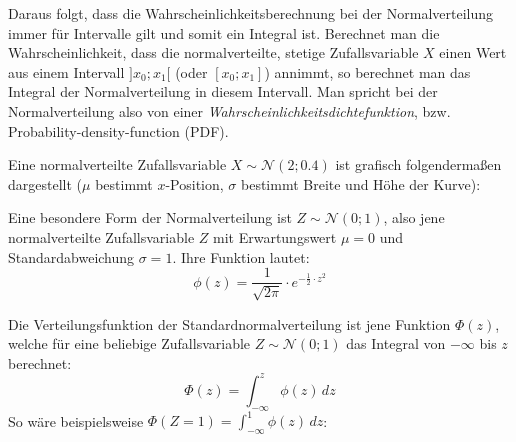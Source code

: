 Daraus folgt, dass die Wahrscheinlichkeitsberechnung bei der Normalverteilung immer f\"{u}r Intervalle gilt und somit ein Integral ist. Berechnet man die Wahrscheinlichkeit, dass die normalverteilte, stetige Zufallsvariable $X$ einen Wert aus einem Intervall $]x_{0}; x_{1}[$ (oder $[x_{0};x_{1}]$) annimmt, so berechnet man das Integral der Normalverteilung in diesem Intervall. Man spricht bei der Normalverteilung also von einer \emph{Wahrscheinlichkeitsdichtefunktion}, bzw. Probability-density-function (PDF).

Eine normalverteilte Zufallsvariable $X \sim \mathcal{N}(2; 0.4)$ ist grafisch folgenderma\ss{}en dargestellt ($\mu$ bestimmt $x$-Position, $\sigma$ bestimmt Breite und H\"{o}he der Kurve):

\vspace{0.25cm}

\begin{figure}[h!]
\end{figure}

\pagebreak


Eine besondere Form der Normalverteilung ist $Z \sim \mathcal{N}(0; 1)$, also jene normalverteilte Zufallsvariable $Z$ mit Erwartungswert $\mu = 0$ und Standardabweichung $\sigma = 1$. Ihre Funktion lautet: $$\phi(z) = \frac{1}{\sqrt{2\pi}} \cdot e^{-\frac{1}{2} \cdot z^2}$$

Die Verteilungsfunktion der Standardnormalverteilung ist jene Funktion $\Phi(z)$, welche f\"{u}r eine beliebige Zufallsvariable $Z \sim \mathcal{N}(0; 1)$ das Integral von $-\infty$ bis $z$ berechnet: $$\Phi(z) = \int_{-\infty}^{z} \phi(z) \, dz$$ So w\"{a}re beispielsweise $\Phi(Z=1) = \int_{-\infty}^{1} \phi(z) \, dz$:

